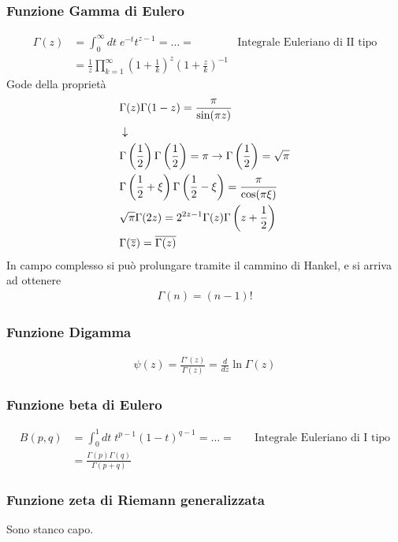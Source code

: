 \subsubsection{Funzione Gamma di Eulero}
\begin{align}
	\Gamma(z) &= \int_{0}^{\infty} dt \; e^{-t} t^{z-1} = \dots =  \quad &\text{Integrale Euleriano di II tipo}\\
	&= \frac{1}{z} \prod_{k=1}^{\infty} \left( 1+ \frac{1}{k} \right)^z \left( 1+ \frac{z}{k} \right)^{-1}
\end{align}
Gode della proprietà	
\begin{align}
	&\Gamma(z) \Gamma(1-z) = \frac{\pi}{\sin(\pi z)} \\ &\downarrow \nonumber \\
	&\Gamma\left(\frac{1}{2}\right) \Gamma\left(\frac{1}{2}\right) = \pi \rightarrow \Gamma \left( \frac{1}{2} \right) = \sqrt{\pi} \\
	&\Gamma\left(\frac{1}{2} + \xi\right) \Gamma\left(\frac{1}{2} - \xi\right) = \frac{\pi}{\cos(\pi \xi)}\\
	&\sqrt{\pi} \Gamma(2z) = 2^{2z-1} \Gamma(z) \Gamma \left( z + \frac{1}{2} \right)\\
	&\Gamma(\overline{z}) = \overline{\Gamma(z)}
\end{align}
In campo complesso si può prolungare tramite il cammino di Hankel, e si arriva ad ottenere
\begin{align}
	\Gamma(n) = (n-1)!
\end{align}

\subsubsection{Funzione Digamma}
\begin{align}
	\psi(z) = \frac{\Gamma'(z)}{\Gamma(z)} = \frac{d}{dz} \ln \Gamma (z)
\end{align}
\subsubsection{Funzione beta di Eulero}
\begin{align}
	B(p,q) &= \int_{0}^{1} dt \; t^{p-1} (1-t)^{q-1} = \dots =  \quad &\text{Integrale Euleriano di I tipo}\\
	&= \frac{\Gamma(p)\Gamma(q)}{\Gamma(p+q)}
\end{align}

\subsubsection{Funzione zeta di Riemann generalizzata}

Sono stanco capo.

\newpage
